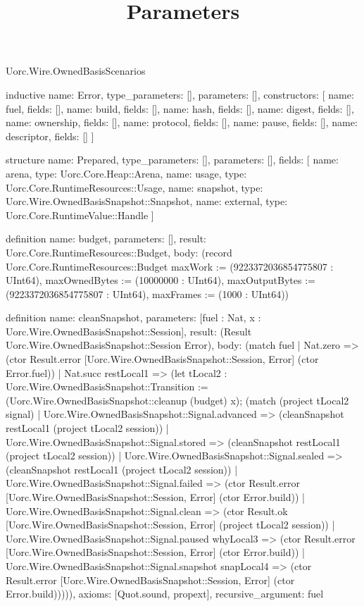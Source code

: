 \begin{lexlean}{Uorc.Wire.OwnedBasisScenarios}
\title{Parameters}
\begin{semanticmodule}
inductive{
  name: Error,
  type_parameters: [],
  parameters: [],
  constructors: [
    {name: fuel, fields: []},
    {name: build, fields: []},
    {name: hash, fields: []},
    {name: digest, fields: []},
    {name: ownership, fields: []},
    {name: protocol, fields: []},
    {name: pause, fields: []},
    {name: descriptor, fields: []}
  ]
}

structure{
  name: Prepared,
  type_parameters: [],
  parameters: [],
  fields: [
    {name: arena, type: Uorc.Core.Heap::Arena},
    {name: usage, type: Uorc.Core.RuntimeResources::Usage},
    {name: snapshot, type: Uorc.Wire.OwnedBasisSnapshot::Snapshot},
    {name: external, type: Uorc.Core.RuntimeValue::Handle}
  ]
}

definition{
  name: budget,
  parameters: [],
  result: Uorc.Core.RuntimeResources::Budget,
  body: (record Uorc.Core.RuntimeResources::Budget {maxWork := (9223372036854775807 : UInt64), maxOwnedBytes := (10000000 : UInt64), maxOutputBytes := (9223372036854775807 : UInt64), maxFrames := (1000 : UInt64)})
}

definition{
  name: cleanSnapshot,
  parameters: [fuel : Nat, x : Uorc.Wire.OwnedBasisSnapshot::Session],
  result: (Result Uorc.Wire.OwnedBasisSnapshot::Session Error),
  body: (match fuel
    | Nat.zero => (ctor Result.error [Uorc.Wire.OwnedBasisSnapshot::Session, Error] (ctor Error.fuel))
    | Nat.succ restLocal1 => (let tLocal2 : Uorc.Wire.OwnedBasisSnapshot::Transition := (Uorc.Wire.OwnedBasisSnapshot::cleanup (budget) x); (match (project tLocal2 signal)
      | Uorc.Wire.OwnedBasisSnapshot::Signal.advanced => (cleanSnapshot restLocal1 (project tLocal2 session))
      | Uorc.Wire.OwnedBasisSnapshot::Signal.stored => (cleanSnapshot restLocal1 (project tLocal2 session))
      | Uorc.Wire.OwnedBasisSnapshot::Signal.sealed => (cleanSnapshot restLocal1 (project tLocal2 session))
      | Uorc.Wire.OwnedBasisSnapshot::Signal.failed => (ctor Result.error [Uorc.Wire.OwnedBasisSnapshot::Session, Error] (ctor Error.build))
      | Uorc.Wire.OwnedBasisSnapshot::Signal.clean => (ctor Result.ok [Uorc.Wire.OwnedBasisSnapshot::Session, Error] (project tLocal2 session))
      | Uorc.Wire.OwnedBasisSnapshot::Signal.paused whyLocal3 => (ctor Result.error [Uorc.Wire.OwnedBasisSnapshot::Session, Error] (ctor Error.build))
      | Uorc.Wire.OwnedBasisSnapshot::Signal.snapshot snapLocal4 => (ctor Result.error [Uorc.Wire.OwnedBasisSnapshot::Session, Error] (ctor Error.build))))),
  axioms: [Quot.sound, propext],
  recursive_argument: fuel
}


\end{semanticmodule}
\end{lexlean}
